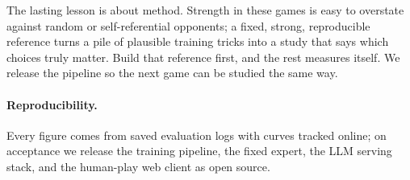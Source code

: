 \documentclass[letterpaper]{article} %
\begin{document}
The lasting lesson is about method. Strength in these games is easy to overstate
against random or self-referential opponents; a fixed, strong, reproducible
reference turns a pile of plausible training tricks into a study that says which
choices truly matter. Build that reference first, and the rest measures itself. We
release the pipeline so the next game can be studied the same way.

\paragraph{Reproducibility.}
Every figure comes from saved evaluation logs with curves tracked online; on
acceptance we release the training pipeline, the fixed expert, the LLM serving
stack, and the human-play web client as open source.
\end{document}
